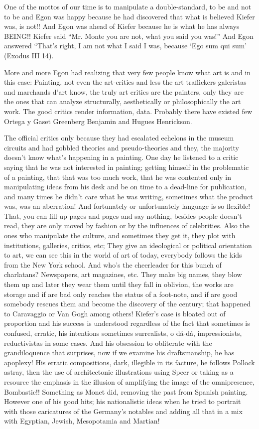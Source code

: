 \documentclass[smalldemyvopaper,11pt,twoside,onecolumn,openright,extrafontsizes]{memoir}
\begin{document}
One of the mottos of our time is to manipulate a double-standard, to be and not to be and Egon was happy because he had discovered that what is believed Kiefer was, is not!! And Egon was ahead of Kiefer because he is what he has always BEING!! Kiefer said “Mr. Monte you are not, what you said you was!” And Egon answered “That’s right, I am not what I said I was, because ‘Ego sum qui sum’ (Exodus III 14).

\ornamentbreak

More and more Egon had realizing that very few people know what art is and in this case: Painting, not even the art-critics and less the art traffickers galeristas and marchands d’art know, the truly art critics are the painters, only they are the ones that can analyze structurally, aesthetically or philosophically the art work.  The good critics render information, data. Probably there have existed few Ortega y Gaset Greenberg Benjamin and Hugues Henrickson.

The official critics only because they had escalated echelons in the museum circuits and had gobbled theories and pseudo-theories and they, the majority doesn’t know what’s happening in a painting. One day he listened to a critic saying that he was not interested in painting; getting himself in the problematic of a painting, that that was too much work, that he was contented only in manipulating ideas from his desk and be on time to a dead-line for publication, and many times he didn’t care what he was writing, sometimes what the product was, was an aberration! And fortunately or unfortunately language is so flexible! That, you can fill-up pages and pages and say nothing, besides people doesn’t read, they are only moved by fashion or by the influences of celebrities. Also the ones who manipulate the culture, and sometimes they get it, they plot with institutions, galleries, critics, etc; They give an ideological or political orientation to art, we can see this in the world of art of today, everybody follows the kids from the New York school. And who’s the cheerleader for this bunch of charlatans? Newspapers, art magazines, etc. They make big names, they blow them up and later they wear them until they fall in oblivion, the works are storage and if are bad only reaches the status of a foot-note, and if are good somebody rescues them and become the discovery of the century; that happened to Caravaggio or Van Gogh among others! Kiefer’s case is bloated out of proportion and his success is understood regardless of the fact that sometimes is confused, erratic, his intentions sometimes surrealists, o dá-dá, impressionists, reductivistas in some cases. And his obsession to obliterate with the grandiloquence that surprises, now if we examine his draftsmanship, he has apoplexy! His erratic compositions, dark, illegible in its facture, he follows Pollock astray, then the use of architectonic illustrations using Speer or taking as a resource the emphasis in the illusion of amplifying the image of the omnipresence, Bombastic!! Something as Monet did, removing the past from Spanish painting. However one of his good hits; his nationalistic ideas when he tried to portrait with those caricatures of the Germany’s notables and adding all that in a mix with Egyptian, Jewish, Mesopotamia and Martian!
\end{document}
